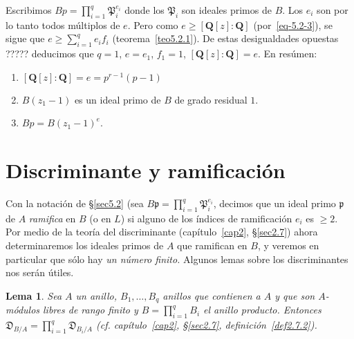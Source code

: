 \documentclass[10pt,oneside,bibtotoc,smallheadings,leqno,a5paper,DIV=12]{scrbook}
\newcommand{\QQ}{\mathbf{Q}}
\newcommand{\idl}[1]{\mathfrak{#1}}
\newcommand{\disc}{\mathfrak{D}}
\numberwithin{equation}{section}
\theoremstyle{defi}
\theoremstyle{enonce}
\newtheorem{lemma}{Lema}
\theoremstyle{rem}
\numberwithin{theorem}{section}
\numberwithin{proposition}{section}
\numberwithin{definition}{section}
\numberwithin{lemma}{section}
\numberwithin{corollary}{section}
\numberwithin{example}{section}
\numberwithin{footnote}{section}%
\begin{document}
Escribimos $Bp = \prod_{i=1}^{q}\idl{P}_{i}^{e_{i}}$ donde los $\idl{P}_{i}$ son ideales primos de $B$. Los
$e_{i}$ son por lo tanto todos m\'ultiplos de $e$. Pero como $e\geq[\QQ[z]:\QQ]$ (por~\eqref{eq-5.2-3}), se sigue
que $e\geq \sum_{i=1}^{q}e_{i}f_{i}$ (teorema~\ref{teo5.2.1}). De estas desigualdades opuestas ????? deducimos que
$q=1$, $e=e_{1}$, $f_{1}=1$, $[\QQ[z]:\QQ]=e$. En res\'umen:
\begin{enumerate}
\item $[\QQ[z]:\QQ]=e=p^{r-1}(p-1)$
\item $B(z_{1}-1)$ es un ideal primo de $B$ de grado residual $1$.
\item $Bp = B(z_{1}-1)^{e}$.
\end{enumerate}

\section{Discriminante y ramificaci\'on}\label{sec5.3}

Con la notaci\'on de \S\ref{sec5.2} (sea $B\idl{p}=\prod_{i=1}^{q}\idl{P}_{i}^{e_{i}}$, decimos que un ideal primo
$\idl{p}$ de $A$ {\em ramifica} en $B$ (o en $L$) si alguno de los \'indices de ramificaci\'on $e_{i}$ es
$\geq 2$. Por medio de la teor\'ia del discriminante (cap\'itulo~\ref{cap2}, \S\ref{sec2.7}) ahora determinaremos los
ideales primos de $A$ que ramifican en $B$, y veremos en particular que s\'olo hay {\em un n\'umero finito.}
Algunos lemas sobre los discriminantes nos ser\'an \'utiles.

\begin{lemma}\label{lem5.3.1}
Sea $A$ un anillo, $B_{1},\dots, B_{q}$ anillos que contienen a $A$ y que son $A$-m\'odulos libres de rango finito
y $B = \prod_{i=1}^{q}B_{i}$ el anillo producto. Entonces $\disc_{B/A}=\prod_{i=1}^{q}\disc_{B_{i}/A}$
(cf. cap\'itulo~\ref{cap2}, \S\ref{sec2.7}, definici\'on~\ref{def2.7.2}).
\end{lemma}
\end{document}

